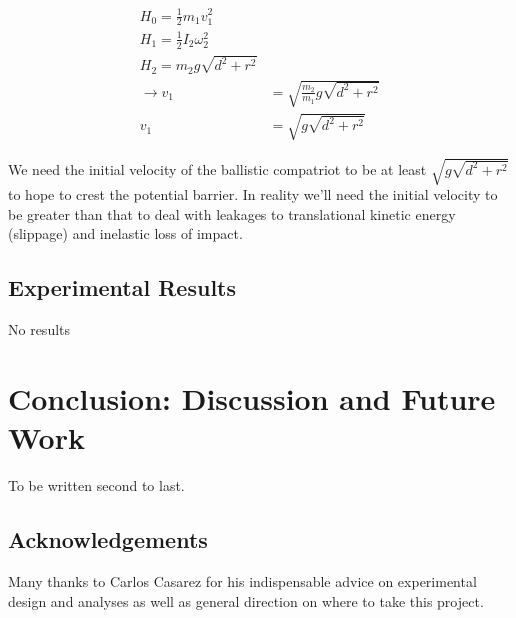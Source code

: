 \documentclass[letterpaper]{report}
\begin{document}
\begin{align}
H_0 = \frac{1}{2} m_1 v_1^2  \\
H_1 = \frac{1}{2} I_2 \omega_2^2  \\
H_2 = m_2 g \sqrt{d^2+r^2} \\
\rightarrow v_1 &= \sqrt{\frac{m_2}{m_1}g \sqrt{d^2+r^2}} \\
 v_1 &= \sqrt{g \sqrt{d^2+r^2}}
\end{align}

We need the initial velocity of the ballistic compatriot to be at least $\sqrt{g \sqrt{d^2+r^2}}$ to hope to crest the potential barrier.
In reality we'll need the initial velocity to be greater than that to deal with leakages to translational kinetic energy (slippage) and inelastic loss of impact.

\section{Experimental Results}
No results

\chapter{Conclusion: Discussion and Future Work}
To be written second to last.

\section{Acknowledgements}
Many thanks to Carlos Casarez for his indispensable advice on experimental design and analyses as well as general direction on where to take this project.



\end{document}
